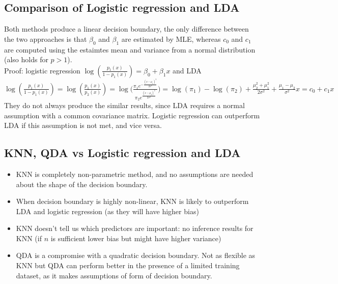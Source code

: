 \documentclass[11pt]{article}
\begin{document}
\subsection{Comparison of Logistic regression and LDA}
\noindent Both methods produce a linear decision boundary, the only difference between the two approaches is that $\beta_0$ and $\beta_1$ are estimated by MLE, whereas $c_0$ and $c_1$ are computed using the estaimtes mean and variance from a normal distribution (also holds for $p > 1$). \\

\noindent Proof: logistic regression $\log(\frac{p_1(x)}{1-p_{1}(x)}) = \beta_0 + \beta_1 x$ and LDA $\log(\frac{p_1(x)}{1-p_1(x)}) = \log(\frac{p_1(x)}{p_2(x)}) = \log\Bigg( \frac{\pi_1 e^{-\frac{(x-\mu_1)^2}{2\sigma^2}}}{\pi_2e^{\frac{(x-\mu_2)^2}{2\sigma^2}}} \Bigg) = \log(\pi_1) - \log(\pi_2) + \frac{\mu_2^2 + \mu_1^2}{2\sigma^2} + \frac{\mu_1 - \mu_2}{\sigma^2}x = c_0 + c_1x$ \\

\noindent They do not always produce the similar results, since LDA requires a normal assumption with a common covariance matrix. Logistic regression can outperform LDA if this assumption is not met, and vice versa.

\subsection{KNN, QDA vs Logistic regression and LDA}
\begin{itemize}
    \item KNN is completely non-parametric method, and no assumptions are needed about the shape of the decision boundary.
    \item When decision boundary is highly non-linear, KNN is likely to outperform LDA and logistic regression (as they will have higher bias)
    \item KNN doesn't tell us which predictors are important: no inference results for KNN (if $n$ is sufficient lower bias but might have higher variance)
    \item QDA is a compromise with a quadratic decision boundary. Not as flexible as KNN but QDA can perform better in the presence of a limited training dataset, as it makes assumptions of form of decision boundary.
\end{itemize}
\end{document}
